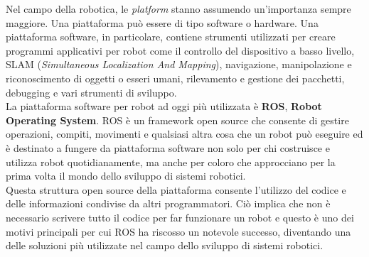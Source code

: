Nel campo della robotica, le \textit{platform} stanno assumendo un'importanza sempre maggiore. Una piattaforma può essere di tipo software o hardware. Una piattaforma software, in particolare, contiene strumenti utilizzati per creare programmi applicativi per robot come il controllo del dispositivo a basso livello, SLAM (\textit{Simultaneous Localization And Mapping}), navigazione, manipolazione e riconoscimento di oggetti o esseri umani, rilevamento e gestione dei pacchetti, debugging e vari strumenti di sviluppo.\\
La piattaforma software per robot ad oggi più utilizzata è \textbf{ROS}, \textbf{Robot Operating System}. ROS è un framework open source che consente di gestire operazioni, compiti, movimenti e qualsiasi altra cosa che un robot può eseguire ed è destinato a fungere da piattaforma software non solo per chi costruisce e utilizza robot quotidianamente, ma anche per coloro che approcciano per la prima volta il mondo dello sviluppo di sistemi robotici.\\
Questa struttura open source della piattaforma consente l'utilizzo del codice e delle informazioni condivise da altri programmatori. Ciò implica che non è necessario scrivere tutto il codice per far funzionare un robot e questo è uno dei motivi principali per cui ROS ha riscosso un notevole successo, diventando una delle soluzioni più utilizzate nel campo dello sviluppo di sistemi robotici.

